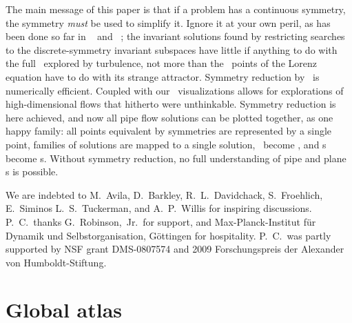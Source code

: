 \documentclass{jfm}
\begin{document}
The main message of this paper is that if a problem has a continuous
symmetry, the symmetry \emph{must} be used to simplify it. Ignore it at
your own peril, as has been done so far in \KS\ \citep{Christiansen97}
and \pCf\ \citep{GHCW07}; the invariant solutions found by restricting
searches to the discrete-symmetry invariant subspaces have little if
anything to do with the full \statesp\ explored by turbulence, not more
than the \eqv\ points of the Lorenz equation have to do with its strange
attractor. Symmetry reduction by \mslices\ is numerically efficient.
Coupled with our \statesp\ visualizations allows for explorations of
high-dimensional flows that hitherto were unthinkable. Symmetry reduction
is here achieved, and now all pipe flow solutions can be plotted
together, as one happy family: all points equivalent by symmetries are
represented by a single point, families of solutions are mapped to a
single solution, \reqva\ become \eqva, and \rpo s become \po s. Without
symmetry reduction, no full understanding of pipe and plane \pCf s is
possible.

\begin{acknowledgments}
We are indebted to
M.~Avila,
D.~Barkley,
R.~L.~Davidchack,
S.~Froehlich,
E.~Siminos
L.~S.~Tuckerman,
and
A.~P.~Willis
for inspiring discussions.
P.~C.\ thanks G.~Robinson,~Jr.\ for support, and
Max-Planck-Institut f\"ur Dynamik und Selbstorganisation,
G\"ottingen for hospitality.
P.~C.\ was partly supported by NSF grant DMS-0807574
and
2009 Forschungspreis der Alexander von Humboldt-Stiftung.
\end{acknowledgments}

\appendix

\section{Global atlas}
\label{appe:slice}
\end{document}
